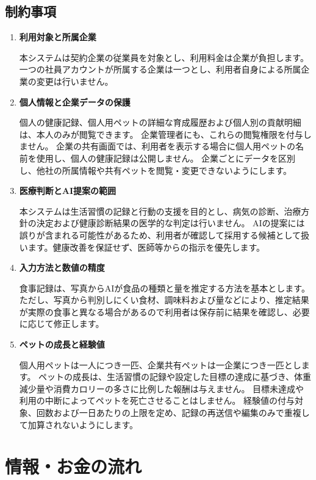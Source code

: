\documentclass[uplatex,dvipdfmx]{jlreq}
\begin{document}
\subsection{制約事項}

\begin{enumerate}
\item \textbf{利用対象と所属企業}

本システムは契約企業の従業員を対象とし、利用料金は企業が負担します。
一つの社員アカウントが所属する企業は一つとし、利用者自身による所属企業の変更は行いません。

\item \textbf{個人情報と企業データの保護}

個人の健康記録、個人用ペットの詳細な育成履歴および個人別の貢献明細は、本人のみが閲覧できます。
企業管理者にも、これらの閲覧権限を付与しません。
企業の共有画面では、利用者を表示する場合に個人用ペットの名前を使用し、個人の健康記録は公開しません。
企業ごとにデータを区別し、他社の所属情報や共有ペットを閲覧・変更できないようにします。

\item \textbf{医療判断とAI提案の範囲}

本システムは生活習慣の記録と行動の支援を目的とし、病気の診断、治療方針の決定および健康診断結果の医学的な判定は行いません。
AIの提案には誤りが含まれる可能性があるため、利用者が確認して採用する候補として扱います。健康改善を保証せず、医師等からの指示を優先します。

\item \textbf{入力方法と数値の精度}

食事記録は、写真からAIが食品の種類と量を推定する方法を基本とします。
ただし、写真から判別しにくい食材、調味料および量などにより、推定結果が実際の食事と異なる場合があるので利用者は保存前に結果を確認し、必要に応じて修正します。

\item \textbf{ペットの成長と経験値}

個人用ペットは一人につき一匹、企業共有ペットは一企業につき一匹とします。
ペットの成長は、生活習慣の記録や設定した目標の達成に基づき、体重減少量や消費カロリーの多さに比例した報酬は与えません。
目標未達成や利用の中断によってペットを死亡させることはしません。
経験値の付与対象、回数および一日あたりの上限を定め、記録の再送信や編集のみで重複して加算されないようにします。
\end{enumerate}



\section{情報・お金の流れ}
\end{document}
